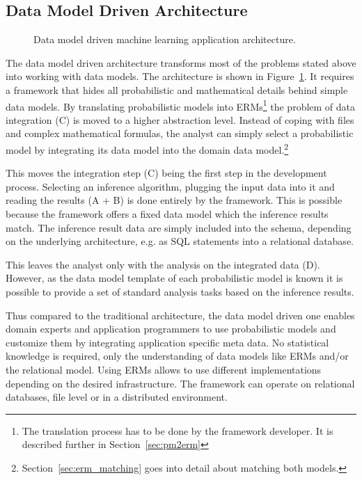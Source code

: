 \subsection{Data Model Driven Architecture}

\begin{figure}
\centering
\scalebox{\tikzScale}{\adjustTikzSize }
\caption[Data model driven machine learning application architecture]{Data model driven machine learning application architecture.}\label{fig:ml-application-architecture-dm}
\end{figure}

The data model driven architecture transforms most of the problems stated above into working with data models. The architecture is shown in Figure~\ref{fig:ml-application-architecture-dm}. It requires a framework that hides all probabilistic and mathematical details behind simple data models. By translating probabilistic models into ERMs\footnote{The translation process has to be done by the framework developer. It is described further in Section~\ref{sec:pm2erm}} the problem of data integration (C) is moved to a higher abstraction level. Instead of coping with files and complex mathematical formulas, the analyst can simply select a probabilistic model by integrating its data model into the domain data model.\footnote{Section~\ref{sec:erm_matching} goes into detail about matching both models.}

This moves the integration step (C) being the first step in the development process. Selecting an inference algorithm, plugging the input data into it and reading the results (A + B) is done entirely by the framework. This is possible because the framework offers a fixed data model which the inference results match. The inference result data are simply included into the schema, depending on the underlying architecture, e.g. as SQL statements into a relational database.

This leaves the analyst only with the analysis on the integrated data (D). However, as the data model template of each probabilistic model is known it is possible to provide a set of standard analysis tasks based on the inference results.

Thus compared to the traditional architecture, the data model driven one enables domain experts and application programmers to use probabilistic models and customize them by integrating application specific meta data. No statistical knowledge is required, only the understanding of data models like ERMs and/or the relational model. Using ERMs allows to use different implementations depending on the desired infrastructure. The framework can operate on relational databases, file level or in a distributed environment.
